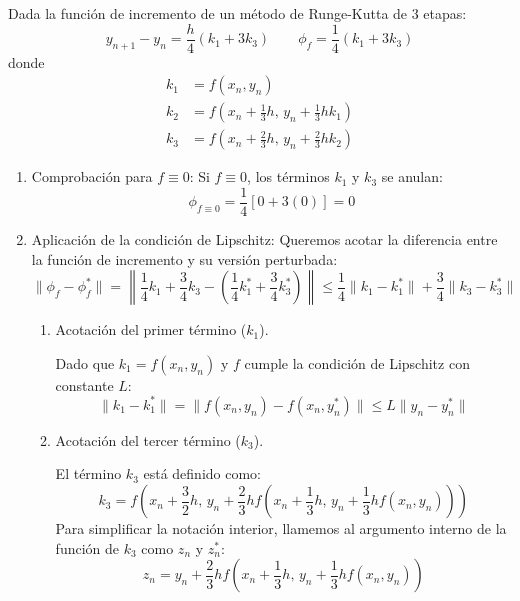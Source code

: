 \begin{sol}[5]
Dada la función de incremento de un método de Runge-Kutta de 3 etapas:
$$ y_{n+1} - y_n= \frac{h}{4} (k_1 + 3k_3) \qquad  
\phi_f = \frac{1}{4} (k_1 + 3k_3)
$$
donde
$$
\begin{aligned}
    k_1 &= f(x_n, y_n) \\ 
    k_2 &= f\left(x_n + \frac{1}{3}h, \, y_n + \frac{1}{3}h k_1\right) \\ 
    k_3 &= f\left(x_n + \frac{2}{3}h, \, y_n + \frac{2}{3}h k_2 \right)
\end{aligned}
$$
\begin{enumerate}
    \item Comprobación para $f \equiv 0$:
    Si $f \equiv 0$, los términos $k_1$ y $k_3$ se anulan:
    $$
    \phi_{f \equiv 0} = \frac{1}{4} \left[ 0 + 3(0) \right] = 0
    $$

    \item Aplicación de la condición de Lipschitz:
    Queremos acotar la diferencia entre la función de incremento y su versión perturbada:
$$
\|\phi_f - \phi_f^*\| = \left\| \frac{1}{4} k_1 + \frac{3}{4} k_3 - \left( \frac{1}{4} k_1^* + \frac{3}{4} k_3^* \right) \right\| \le \frac{1}{4} \|k_1 - k_1^*\| + \frac{3}{4} \|k_3 - k_3^*\|
$$
\begin{enumerate}
    \item Acotación del primer término ($k_1$).
    
Dado que $k_1 = f(x_n, y_n)$ y $f$ cumple la condición de Lipschitz con constante $L$:
$$
\|k_1 - k_1^*\| = \|f(x_n, y_n) - f(x_n, y_n^*)\| \le L \|y_n - y_n^*\|
$$
\item Acotación del tercer término ($k_3$).

El término $k_3$ está definido como:
$$
k_3 = f\left(x_n + \frac{3}{2}h, \, y_n + \frac{2}{3}h f\left(x_n + \frac{1}{3}h, \, y_n + \frac{1}{3}h f(x_n, y_n)\right)\right)
$$
Para simplificar la notación interior, llamemos al argumento interno de la función de $k_3$ como $z_n$ y $z_n^*$:
$$
z_n = y_n + \frac{2}{3}h f\left(x_n + \frac{1}{3}h, \, y_n + \frac{1}{3}h f(x_n, y_n)\right)
$$


\end{enumerate}
\end{enumerate}
\end{sol}
